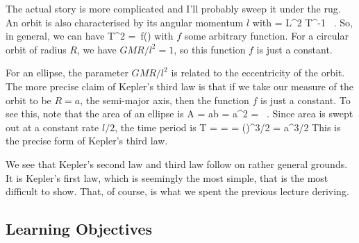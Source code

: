 \para
{\cblue The actual story is more complicated and I'll probably sweep it under the rug. An orbit is also characterised by its angular momentum $l$ with
%
\be [l] = L^2 T^{-1} \ .\ee
%
So, in general, we can have
%
\be T^2 = \,f\left(\right)\ee
%
with $f$ some arbitrary function. For a circular orbit of radius $R$, we have $GMR/l^2=1$, so this function $f$ is just a constant.

\para
 For an ellipse,  the parameter $GMR/l^2$ is related to the eccentricity of the orbit. The more precise claim of Kepler's third law is that  if we take our measure of the orbit to be $R=a$, the semi-major axis, then the function $f$ is just a constant. To see this, note that the area of an ellipse is 
%
\be A = \pi ab = \pi a^2  = \ .\ee
%
Since area is swept out at a constant rate $l/2$, the time period is 
%
\be T =  =  = \left(\right)^{3/2} = a^{3/2}\ee
%
This is the precise form of Kepler's third law.}



%
%
%
%


\para
We see that Kepler's second  law and third  law follow on rather general grounds. It is Kepler's first law, which is seemingly the most simple, that is the most difficult to show. That, of course, is what we spent the previous lecture deriving. 


\subsection{Learning Objectives}

